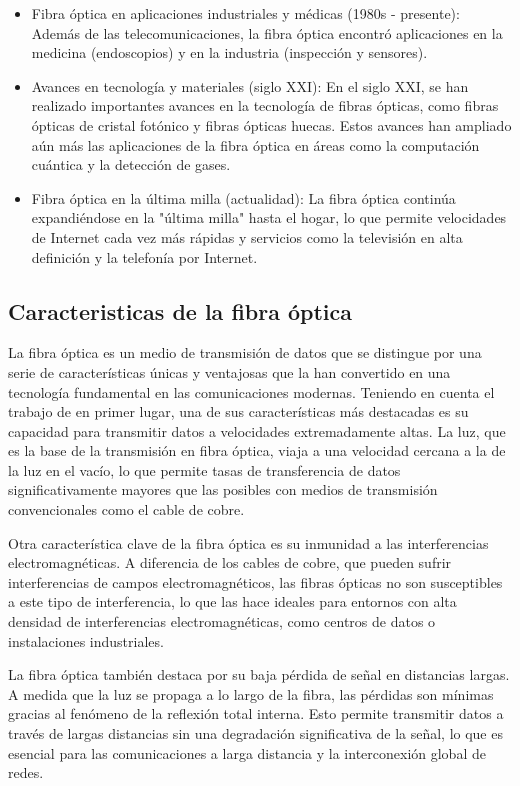 \documentclass[10.5pt]{article}
\begin{document}
\begin{itemize}
        \item Fibra óptica en aplicaciones industriales y médicas (1980s - presente): Además de las telecomunicaciones, la fibra óptica encontró aplicaciones en la medicina (endoscopios) y en la industria (inspección y sensores).
        \item Avances en tecnología y materiales (siglo XXI): En el siglo XXI, se han realizado importantes avances en la tecnología de fibras ópticas, como fibras ópticas de cristal fotónico y fibras ópticas huecas. Estos avances han ampliado aún más las aplicaciones de la fibra óptica en áreas como la computación cuántica y la detección de gases.
        \item Fibra óptica en la última milla (actualidad): La fibra óptica continúa expandiéndose en la "última milla" hasta el hogar, lo que permite velocidades de Internet cada vez más rápidas y servicios como la televisión en alta definición y la telefonía por Internet.
    \end{itemize}
    \subsection{Caracteristicas de la fibra óptica}
    La fibra óptica es un medio de transmisión de datos que se distingue por una serie de características únicas y ventajosas que la han convertido en una tecnología fundamental en las comunicaciones modernas. Teniendo en cuenta el trabajo de \cite{santiago} en primer lugar, una de sus características más destacadas es su capacidad para transmitir datos a velocidades extremadamente altas. La luz, que es la base de la transmisión en fibra óptica, viaja a una velocidad cercana a la de la luz en el vacío, lo que permite tasas de transferencia de datos significativamente mayores que las posibles con medios de transmisión convencionales como el cable de cobre.

    Otra característica clave de la fibra óptica es su inmunidad a las interferencias electromagnéticas. A diferencia de los cables de cobre, que pueden sufrir interferencias de campos electromagnéticos, las fibras ópticas no son susceptibles a este tipo de interferencia, lo que las hace ideales para entornos con alta densidad de interferencias electromagnéticas, como centros de datos o instalaciones industriales.

    La fibra óptica también destaca por su baja pérdida de señal en distancias largas. A medida que la luz se propaga a lo largo de la fibra, las pérdidas son mínimas gracias al fenómeno de la reflexión total interna. Esto permite transmitir datos a través de largas distancias sin una degradación significativa de la señal, lo que es esencial para las comunicaciones a larga distancia y la interconexión global de redes.
\end{document}
